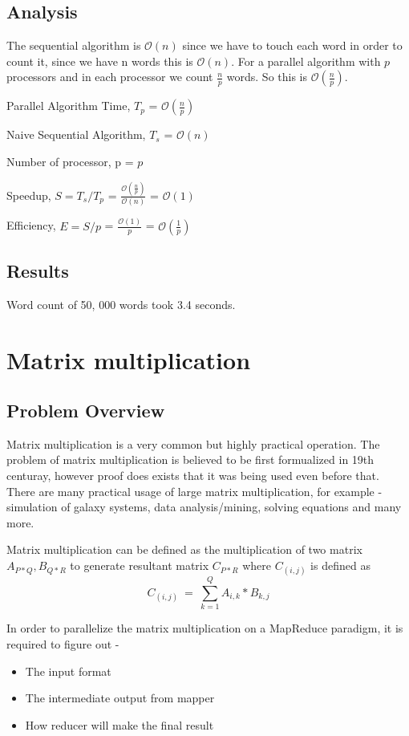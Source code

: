 \documentclass{article}
\begin{document}
\subsection{Analysis}
\BlankLine The sequential algorithm is $\mathcal{O}(n)$ since we have to touch each word in order to count it, since we have n words this is $\mathcal{O}(n)$. For a parallel algorithm with $p$ processors and in each processor we count $\frac{n}{p}$ words. So this is $\mathcal{O}(\frac{n}{p})$.


Parallel Algorithm Time, ${T_{p}}$ = $\mathcal{O}(\frac{n}{p})$

Naive Sequential Algorithm, ${T_{s}}$ = $\mathcal{O}(n)$

Number of processor, p = $p$

Speedup, ${S = T_{s}/T_{p}}$ = $\frac{\mathcal{O}(\frac{n}{p})}{\mathcal{O}(n)}$ = $\mathcal{O}(1)$

Efficiency, ${E = S/p}$ = $\frac{\mathcal{O}(1)}{p}$ = $\mathcal{O}(\frac{1}{p})$

\subsection{Results}
Word count of 50, 000 words took 3.4 seconds.
\section{Matrix multiplication}

\subsection{Problem Overview}
Matrix multiplication is a very common but highly practical operation. The problem of matrix multiplication is believed to be first formualized in 19th centuray, however proof does exists that it was being used even before that. There are many practical usage of large matrix multiplication, for example - simulation of galaxy systems, data analysis/mining, solving equations and many more.

Matrix multiplication can be defined as the multiplication of two matrix ${A_{P*Q},B_{Q*R}}$ to generate resultant matrix ${C_{P*R}}$ where ${C_{(i,j)}}$ is defined as
\begin{equation}
C_{(i,j)}\ =\ \sum_{k = 1}^{Q} A_{i, k} *  B_{k,j}
\end{equation}

In order to parallelize the matrix multiplication on a MapReduce paradigm, it is required to figure out -
\begin{itemize}
\item The input format
\item The intermediate output from mapper
\item How reducer will make the final result
\end{itemize}
\end{document}
